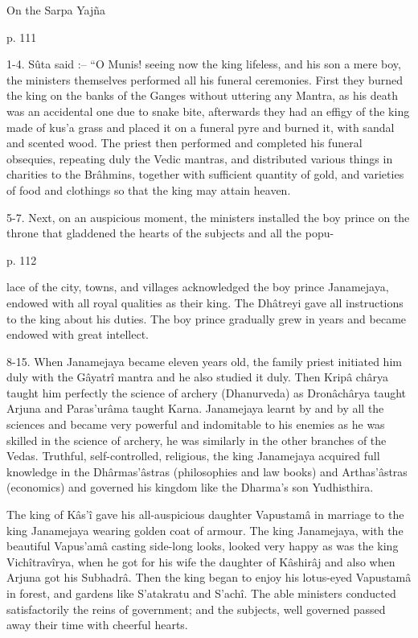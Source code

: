 ﻿On the Sarpa Yajña

 

p. 111

 

1-4. Sûta said :-- “O Munis! seeing now the king lifeless, and his son a mere boy, the ministers themselves performed all his funeral ceremonies. First they burned the king on the banks of the Ganges without uttering any Mantra, as his death was an accidental one due to snake bite, afterwards they had an effigy of the king made of kus’a grass and placed it on a funeral pyre and burned it, with sandal and scented wood. The priest then performed and completed his funeral obsequies, repeating duly the Vedic mantras, and distributed various things in charities to the Brâhmins, together with sufficient quantity of gold, and varieties of food and clothings so that the king may attain heaven.

 

5-7. Next, on an auspicious moment, the ministers installed the boy prince on the throne that gladdened the hearts of the subjects and all the popu-

 

p. 112

 

lace of the city, towns, and villages acknowledged the boy prince Janamejaya, endowed with all royal qualities as their king. The Dhâtreyi gave all instructions to the king about his duties. The boy prince gradually grew in years and became endowed with great intellect.

 

8-15. When Janamejaya became eleven years old, the family priest initiated him duly with the Gâyatrî mantra and he also studied it duly. Then Kripâ chârya taught him perfectly the science of archery (Dhanurveda) as Dronâchârya taught Arjuna and Paras'urâma taught Karna. Janamejaya learnt by and by all the sciences and became very powerful and indomitable to his enemies as he was skilled in the science of archery, he was similarly in the other branches of the Vedas. Truthful, self-controlled, religious, the king Janamejaya acquired full knowledge in the Dhârmas'âstras (philosophies and law books) and Arthas'âstras (economics) and governed his kingdom like the Dharma's son Yudhisthira.

 

The king of Kâs'î gave his all-auspicious daughter Vapustamâ in marriage to the king Janamejaya wearing golden coat of armour. The king Janamejaya, with the beautiful Vapus'amâ casting side-long looks, looked very happy as was the king Vichîtravîrya, when he got for his wife the daughter of Kâshirâj and also when Arjuna got his Subhadrâ. Then the king began to enjoy his lotus-eyed Vapustamâ in forest, and gardens like S’atakratu and S’achî. The able ministers conducted satisfactorily the reins of government; and the subjects, well governed passed away their time with cheerful hearts.

